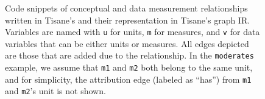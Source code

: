 {\begin{figure}
\begin{tikzpicture}
        \end{tikzpicture}
        \caption{Code snippets of conceptual and data measurement relationships written in Tisane's \SDSLlong and their representation in Tisane's graph IR. Variables are named with \texttt{u} for units, \texttt{m} for measures, and \texttt{v} for data variables that can be either units or measures. All edges depicted are those that are added due to the relationship. In the \texttt{moderates} example, we assume that \texttt{m1} and \texttt{m2} both belong to the same unit, and for simplicity, the attribution edge (labeled as ``has'') from \texttt{m1} and \texttt{m2}'s unit is not shown.}
        \label{fig:figureSDSLToGraphIR}
    \end{figure}
}


